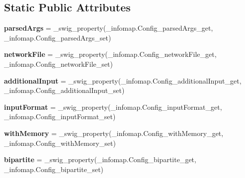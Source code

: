 \subsection*{Static Public Attributes}
\begin{DoxyCompactItemize}
\item 
\mbox{\label{classdsmacc_1_1graph_1_1infomap_1_1infomap_1_1Config_aa270e32f976792e54f7e1ef380d07530}} 
{\bfseries parsed\+Args} = \+\_\+swig\+\_\+property(\+\_\+infomap.\+Config\+\_\+parsed\+Args\+\_\+get, \+\_\+infomap.\+Config\+\_\+parsed\+Args\+\_\+set)
\item 
\mbox{\label{classdsmacc_1_1graph_1_1infomap_1_1infomap_1_1Config_aec259ce996925b370967ec191c9e2285}} 
{\bfseries network\+File} = \+\_\+swig\+\_\+property(\+\_\+infomap.\+Config\+\_\+network\+File\+\_\+get, \+\_\+infomap.\+Config\+\_\+network\+File\+\_\+set)
\item 
\mbox{\label{classdsmacc_1_1graph_1_1infomap_1_1infomap_1_1Config_a2045ee337d996a79e66cc35bc350835a}} 
{\bfseries additional\+Input} = \+\_\+swig\+\_\+property(\+\_\+infomap.\+Config\+\_\+additional\+Input\+\_\+get, \+\_\+infomap.\+Config\+\_\+additional\+Input\+\_\+set)
\item 
\mbox{\label{classdsmacc_1_1graph_1_1infomap_1_1infomap_1_1Config_a65b2e1b5d392b64b80f0c7f42312a9ec}} 
{\bfseries input\+Format} = \+\_\+swig\+\_\+property(\+\_\+infomap.\+Config\+\_\+input\+Format\+\_\+get, \+\_\+infomap.\+Config\+\_\+input\+Format\+\_\+set)
\item 
\mbox{\label{classdsmacc_1_1graph_1_1infomap_1_1infomap_1_1Config_adb26d120d263dcf948e927315688a0af}} 
{\bfseries with\+Memory} = \+\_\+swig\+\_\+property(\+\_\+infomap.\+Config\+\_\+with\+Memory\+\_\+get, \+\_\+infomap.\+Config\+\_\+with\+Memory\+\_\+set)
\item 
\mbox{\label{classdsmacc_1_1graph_1_1infomap_1_1infomap_1_1Config_a5984f47b193fd62e7710c7b2981079d4}} 
{\bfseries bipartite} = \+\_\+swig\+\_\+property(\+\_\+infomap.\+Config\+\_\+bipartite\+\_\+get, \+\_\+infomap.\+Config\+\_\+bipartite\+\_\+set)

\end{DoxyCompactItemize}
